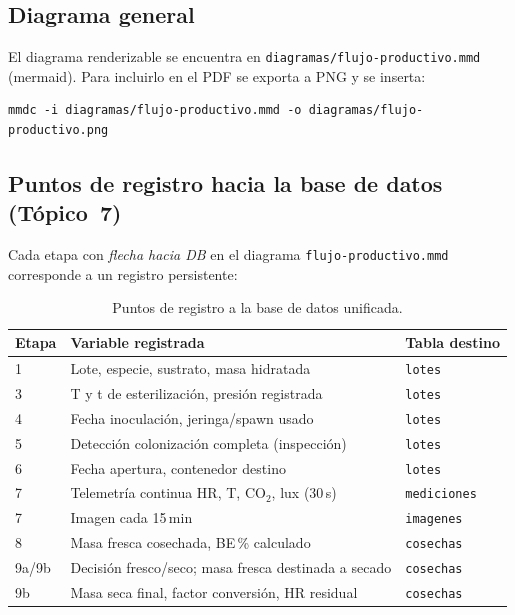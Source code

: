 \subsection{Diagrama general}
\label{sec:flujo:diagrama}

El diagrama renderizable se encuentra en
\texttt{diagramas/flujo-productivo.mmd} (mermaid). Para incluirlo en el
PDF se exporta a PNG y se inserta:

\begin{verbatim}
mmdc -i diagramas/flujo-productivo.mmd -o diagramas/flujo-productivo.png
\end{verbatim}

\subsection{Puntos de registro hacia la base de datos (Tópico~7)}
\label{sec:flujo:registro}

Cada etapa con \emph{flecha hacia DB} en el diagrama
\texttt{flujo-productivo.mmd} corresponde a un registro persistente:

\begin{table}[H]
  \centering
  \caption{Puntos de registro a la base de datos unificada.}
  \label{tab:registro}
  \begin{tabularx}{\linewidth}{lXl}
    \toprule
    \textbf{Etapa} & \textbf{Variable registrada} & \textbf{Tabla destino} \\
    \midrule
    1 & Lote, especie, sustrato, masa hidratada                   & \texttt{lotes} \\
    3 & T y t de esterilización, presión registrada               & \texttt{lotes} \\
    4 & Fecha inoculación, jeringa/spawn usado                    & \texttt{lotes} \\
    5 & Detección colonización completa (inspección)              & \texttt{lotes} \\
    6 & Fecha apertura, contenedor destino                        & \texttt{lotes} \\
    7 & Telemetría continua HR, T, CO$_2$, lux (30\,s)            & \texttt{mediciones} \\
    7 & Imagen cada 15\,min                                       & \texttt{imagenes} \\
    8 & Masa fresca cosechada, BE\,\% calculado                   & \texttt{cosechas} \\
    9a/9b & Decisión fresco/seco; masa fresca destinada a secado  & \texttt{cosechas} \\
    9b & Masa seca final, factor conversión, HR residual          & \texttt{cosechas} \\
    \bottomrule
  \end{tabularx}
\end{table}

